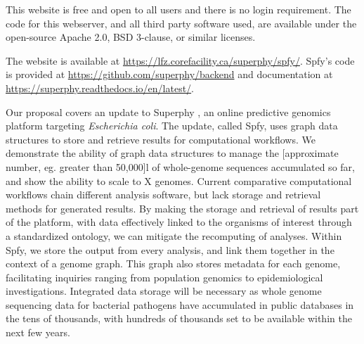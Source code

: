 \documentclass{article}
\begin{document}
This website is free and open to all users and there is no login requirement. The code for this webserver, and all third party software used, are available under the open-source Apache 2.0, BSD 3-clause, or similar licenses. \para

The website is available at \url{https://lfz.corefacility.ca/superphy/spfy/}. Spfy's code is provided at \url{https://github.com/superphy/backend} and documentation at \url{https://superphy.readthedocs.io/en/latest/}. \para

Our proposal covers an update to Superphy \citep{whiteside2016superphy}, an online predictive genomics platform targeting \textit{Escherichia coli}.
The update, called Spfy, uses graph data structures to store and retrieve results for computational workflows.
We demonstrate the ability of graph data structures to manage the [approximate number, eg. greater than 50,000]l of whole-genome sequences accumulated so far, and show the ability to scale to X genomes.
Current comparative computational workflows chain different analysis software, but lack storage and retrieval methods for generated results.
By making the storage and retrieval of results part of the platform, with data effectively linked to the organisms of interest through a standardized ontology, we can mitigate the recomputing of analyses.
Within Spfy, we store the output from every analysis, and link them together in the context of a genome graph. This graph also stores metadata for each genome, facilitating inquiries ranging from population genomics to epidemiological investigations.
Integrated data storage will be necessary as whole genome sequencing data for bacterial pathogens have accumulated in public databases in the tens of thousands, with hundreds of thousands set to be available within the next few years. \para
\end{document}
